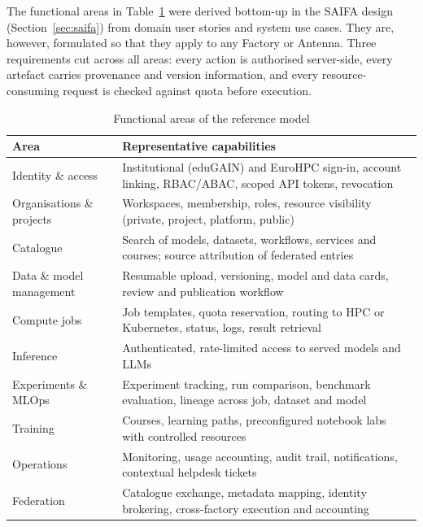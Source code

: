 \documentclass[conference,a4paper]{IEEEtran}
\begin{document}
The functional areas in Table~\ref{tab:func} were derived bottom-up in the SAIFA design (Section~\ref{sec:saifa}) from domain user stories and system use cases. They are, however, formulated so that they apply to any Factory or Antenna. Three requirements cut across all areas: every action is authorised server-side, every artefact carries provenance and version information, and every resource-consuming request is checked against quota before execution.

\begin{table}[t]
\centering
\caption{Functional areas of the reference model}
\label{tab:func}
\footnotesize
\renewcommand{\arraystretch}{1.1}
\begin{tabular}{@{}p{2.1cm}p{5.9cm}@{}}
\toprule
\textbf{Area} & \textbf{Representative capabilities} \\
\midrule
Identity \& access & Institutional (eduGAIN) and EuroHPC sign-in, account linking, RBAC/ABAC, scoped API tokens, revocation \\
Organisations \& projects & Workspaces, membership, roles, resource visibility (private, project, platform, public) \\
Catalogue & Search of models, datasets, workflows, services and courses; source attribution of federated entries \\
Data \& model management & Resumable upload, versioning, model and data cards, review and publication workflow \\
Compute jobs & Job templates, quota reservation, routing to HPC or Kubernetes, status, logs, result retrieval \\
Inference & Authenticated, rate-limited access to served models and LLMs \\
Experiments \& MLOps & Experiment tracking, run comparison, benchmark evaluation, lineage across job, dataset and model \\
Training & Courses, learning paths, preconfigured notebook labs with controlled resources \\
Operations & Monitoring, usage accounting, audit trail, notifications, contextual helpdesk tickets \\
Federation & Catalogue exchange, metadata mapping, identity brokering, cross-factory execution and accounting \\
\bottomrule
\end{tabular}
\end{table}
\end{document}

